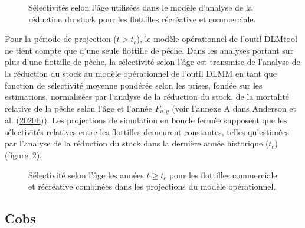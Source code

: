 \documentclass[french,11pt]{book}
\begin{document}
\begin{figure}[htb]

{\centering {} 

}

\caption{Sélectivités selon l'âge utilisées dans le modèle d'analyse de la réduction du stock pour les flottilles récréative et commerciale.}\label{fig:sra-selectivity}
\end{figure}
Pour la période de projection (\(t > t_c\)), le modèle opérationnel de l'outil DLMtool ne tient compte que d'une seule flottille de pêche. Dans les analyses portant sur plus d'une flottille de pêche, la sélectivité selon l'âge est transmise de l'analyse de la réduction du stock au modèle opérationnel de l'outil DLMM en tant que fonction de sélectivité moyenne pondérée selon les prises, fondée sur les estimations, normalisées par l'analyse de la réduction du stock, de la mortalité relative de la pêche selon l'âge et l'année \(F_{a,y}\) (voir l'annexe A dans Anderson et al. (\protect\hyperlink{ref-anderson2020gfmp}{2020b})). Les projections de simulation en boucle fermée supposent que les sélectivités relatives entre les flottilles demeurent constantes, telles qu'estimées par l'analyse de la réduction du stock dans la dernière année historique (\(t_c\)) (figure~\ref{fig:om-selectivity}).


\begin{figure}[htb]

{\centering {} 

}

\caption{Sélectivité selon l'âge les années \(t \geq t_c\) pour les flottilles commerciale et récréative combinées dans les projections du modèle opérationnel.}\label{fig:om-selectivity}
\end{figure}
\clearpage

\label{app:desc-obs-yelloweye}

\subsection{Cobs}
\label{app:desc-obs-cobs-yelloweye}
\end{document}
